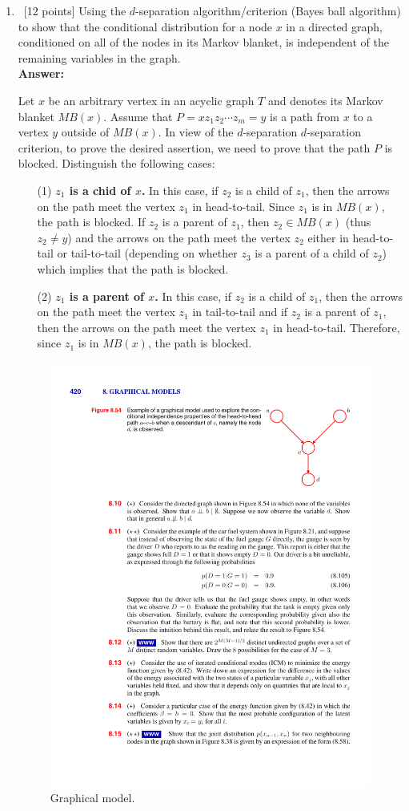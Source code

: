 \documentclass[12pt, fullpage,letterpaper]{article}
\def\red{\color{black!30!red}}
\def\blackblue{\color{black!40!blue}}
\begin{document}
\begin{enumerate}
\item~[12 points] Using the $d$-separation algorithm/criterion (Bayes ball algorithm) to show that the conditional distribution for a node $x$ in a directed graph, conditioned on all of the nodes in its Markov blanket, is independent of the remaining variables in the graph.\\
{\bf \red Answer: }{\blackblue 
Let $x$ be an arbitrary vertex in an acyclic graph $T$ and denotes its Markov blanket $MB(x)$. 
Assume that $P=xz_1z_2\cdots z_m=y$ is a path from $x$ to a vertex $y$ outside of $MB(x)$.
In view of the $d$-separation $d$-separation criterion, to prove the desired assertion, we need to prove that the path $P$ is blocked. 
Distinguish the following cases:
\begin{itemize}
\item[(1)] {\bf $z_1$ is a chid of $x$.} In this case, if $z_2$ is a child of $z_1$, then the arrows on the path meet the vertex $z_1$ in head-to-tail. Since $z_1$ is in $MB(x)$, the path is blocked. If $z_2$ is a parent of $z_1$, then $z_2\in MB(x)$ (thus $z_2\neq y$) and the arrows on the path meet the vertex $z_2$ either in head-to-tail or tail-to-tail (depending on whether $z_3$ is a parent of a child of $z_2$) which implies that the path is blocked. 
\item[(2)] {\bf $z_1$ is a parent of $x$.} In this case, if $z_2$ is a child of $z_1$, then the arrows on the path meet the vertex $z_1$ in tail-to-tail and if 
$z_2$ is a parent of $z_1$, then the arrows on the path meet the vertex $z_1$ in head-to-tail. Therefore, since $z_1$ is in $MB(x)$, the path is blocked. \end{itemize}

}


\begin{figure}[h]
\centering
\includegraphics[width=0.3\linewidth]{./fig1.pdf} 
\caption{Graphical model.} \label{fig:graph}
\end{figure}


\end{enumerate}
\end{document}
